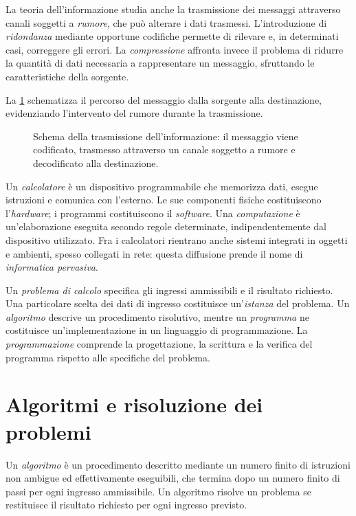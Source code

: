 \clearpage

La teoria dell'informazione studia anche la trasmissione dei messaggi
attraverso canali soggetti a \emph{rumore}, che può alterare i dati
trasmessi. L'introduzione di \emph{ridondanza} mediante opportune
codifiche permette di rilevare e, in determinati casi, correggere
gli errori. La \emph{compressione} affronta invece il problema di
ridurre la quantità di dati necessaria a rappresentare un messaggio,
sfruttando le caratteristiche della sorgente.

La \cref{fig:fi-trasmissione-informazione} schematizza il percorso
del messaggio dalla sorgente alla destinazione, evidenziando
l'intervento del rumore durante la trasmissione.

\begin{figure}[htbp]
  \centering
  \resizebox{\linewidth}{!}{%
  }
  \caption{Schema della trasmissione dell'informazione: il messaggio
  viene codificato, trasmesso attraverso un canale soggetto a rumore
  e decodificato alla destinazione.}
  \label{fig:fi-trasmissione-informazione}
\end{figure}

Un \emph{calcolatore} è un dispositivo programmabile che memorizza dati,
esegue istruzioni e comunica con l'esterno. Le sue componenti fisiche
costituiscono l'\emph{hardware}; i programmi costituiscono il
\emph{software}. Una \emph{computazione} è un'elaborazione eseguita
secondo regole determinate, indipendentemente dal dispositivo utilizzato.
Fra i calcolatori rientrano anche sistemi integrati in oggetti e
ambienti, spesso collegati in rete: questa diffusione prende il nome di
\emph{informatica pervasiva}.

Un \emph{problema di calcolo} specifica gli ingressi ammissibili e il
risultato richiesto. Una particolare scelta dei dati di ingresso
costituisce un'\emph{istanza} del problema. Un \emph{algoritmo}
descrive un procedimento risolutivo, mentre un \emph{programma}
ne costituisce un'implementazione in un linguaggio di programmazione.
La \emph{programmazione} comprende la progettazione, la scrittura e la
verifica del programma rispetto alle specifiche del problema.

\section{Algoritmi e risoluzione dei problemi}
\label{sec:fi-algoritmi}

\begin{definition}[Algoritmo]
\label{def:fi-algoritmo}
Un \emph{algoritmo} è un procedimento descritto mediante un numero finito
di istruzioni non ambigue ed effettivamente eseguibili, che termina dopo
un numero finito di passi per ogni ingresso ammissibile. Un algoritmo
risolve un problema se restituisce il risultato richiesto per ogni
ingresso previsto.
\end{definition}

